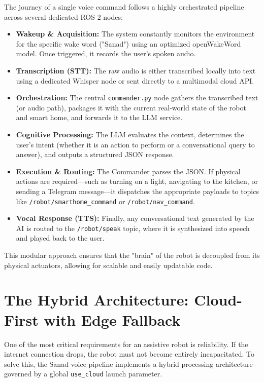 The journey of a single voice command follows a highly orchestrated pipeline across several dedicated ROS 2 nodes:
\begin{itemize}
    \item \textbf{Wakeup \& Acquisition:} The system constantly monitors the environment for the specific wake word ("Sanad") using an optimized openWakeWord model. Once triggered, it records the user's spoken audio.
    \item \textbf{Transcription (STT):} The raw audio is either transcribed locally into text using a dedicated Whisper node or sent directly to a multimodal cloud API.
    \item \textbf{Orchestration:} The central \texttt{commander.py} node gathers the transcribed text (or audio path), packages it with the current real-world state of the robot and smart home, and forwards it to the LLM service.
    \item \textbf{Cognitive Processing:} The LLM evaluates the context, determines the user's intent (whether it is an action to perform or a conversational query to answer), and outputs a structured JSON response.
    \item \textbf{Execution \& Routing:} The Commander parses the JSON. If physical actions are required—such as turning on a light, navigating to the kitchen, or sending a Telegram message—it dispatches the appropriate payloads to topics like \texttt{/robot/smarthome\_command} or \texttt{/robot/nav\_command}.
    \item \textbf{Vocal Response (TTS):} Finally, any conversational text generated by the AI is routed to the \texttt{/robot/speak} topic, where it is synthesized into speech and played back to the user.
\end{itemize}

This modular approach ensures that the "brain" of the robot is decoupled from its physical actuators, allowing for scalable and easily updatable code.

\section{The Hybrid Architecture: Cloud-First with Edge Fallback}
One of the most critical requirements for an assistive robot is reliability. If the internet connection drops, the robot must not become entirely incapacitated. To solve this, the Sanad voice pipeline implements a hybrid processing architecture governed by a global \texttt{use\_cloud} launch parameter.

